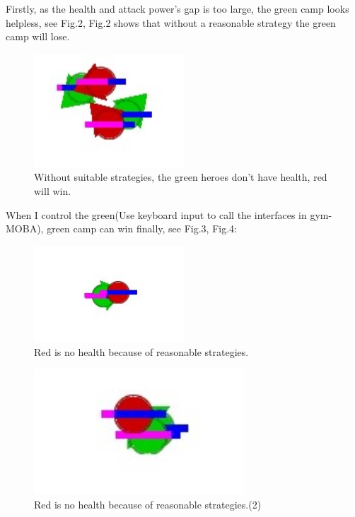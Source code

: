 \documentclass[runningheads]{llncs}
\begin{document}
Firstly, as the health and attack power's gap is too large, the green camp looks helpless, see Fig.2, Fig.2 shows that without a reasonable strategy the green camp will lose.
\begin{figure}
	\centering
	\includegraphics[width=0.50\textwidth]{2.jpg}
	\caption{Without suitable strategies, the green heroes don't have health, red will win.}
\end{figure}


When I control the green(Use keyboard input to call the interfaces in gym-MOBA), green camp can win finally, see Fig.3, Fig.4:

\begin{figure}
	\centering
	\includegraphics[width=0.50\textwidth]{3.jpg}
	\caption{Red is no health because of reasonable strategies. }
\end{figure}

\begin{figure}
	\centering
	\includegraphics[width=0.70\textwidth]{4.jpg}
	\caption{Red is no health because of reasonable strategies.(2)}
\end{figure}
\end{document}
